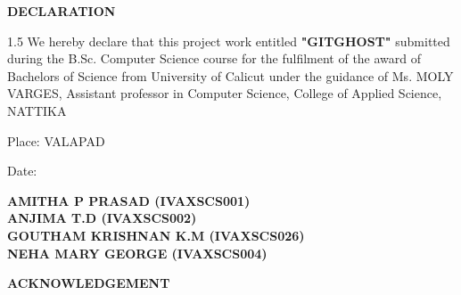 \documentclass[12pt, a4paper, oneside]{report}
\begin{document}
\begin{singlespacing}
\begin{center}
    {\large \textbf{DECLARATION} \par}
\end{center}
\vspace{1cm}
\begin{spacing}{1.5}
We hereby declare that this project work entitled \textbf{"GITGHOST"} submitted during the B.Sc. Computer Science course for the fulfilment of the award of Bachelors of Science from University of Calicut under the guidance of Ms. MOLY VARGES, Assistant professor in Computer Science, College of Applied Science, NATTIKA
\end{spacing}

\vspace{1.5cm}
\noindent Place: VALAPAD \par
\vspace{0.2cm}
\noindent Date: 

\vspace{1.5cm}
\begin{flushright}
    \textbf{AMITHA P PRASAD (IVAXSCS001)} \\ \vspace{0.4cm}
    \textbf{ANJIMA T.D (IVAXSCS002)} \\ \vspace{0.4cm}
    \textbf{GOUTHAM KRISHNAN K.M (IVAXSCS026)} \\ \vspace{0.4cm}
    \textbf{NEHA MARY GEORGE (IVAXSCS004)}
\end{flushright}
\end{singlespacing}
\newpage
\begin{center}
    {\Large \textbf{ACKNOWLEDGEMENT} \par}
\end{center}
\vspace{1cm}
\end{document}
